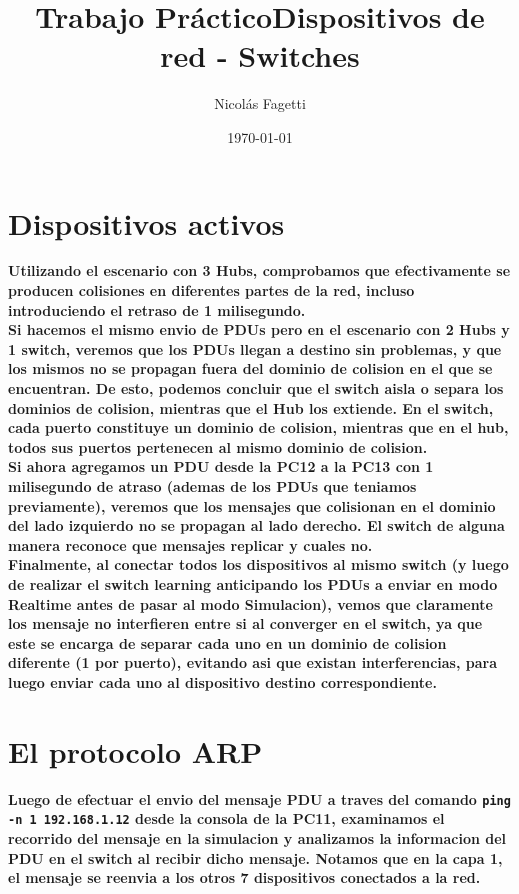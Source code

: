 \documentclass{article}
\title{Trabajo Práctico}
\title{Dispositivos de red - Switches}
\author{Nicolás Fagetti}
\date{\today}
\begin{document}
\maketitle

\section{Dispositivos activos}

\textbf{Utilizando el escenario con 3 Hubs, comprobamos que efectivamente se producen colisiones en diferentes partes de la red, incluso introduciendo el retraso de 1 milisegundo.} \\

\textbf{Si hacemos el mismo envio de PDUs pero en el escenario con 2 Hubs y 1 switch, veremos que los PDUs llegan a destino sin problemas, y que los mismos no se propagan fuera del dominio de colision en el que se encuentran. De esto, podemos concluir que el switch aisla o separa los dominios de colision, mientras que el Hub los extiende. En el switch, cada puerto constituye un dominio de colision, mientras que en el hub, todos sus puertos pertenecen al mismo dominio de colision.} \\

\textbf{Si ahora agregamos un PDU desde la PC12 a la PC13 con 1 milisegundo de atraso (ademas de los PDUs que teniamos previamente), veremos que los mensajes que colisionan en el dominio del lado izquierdo no se propagan al lado derecho. El switch de alguna manera reconoce que mensajes replicar y cuales no.} \\

\textbf{Finalmente, al conectar todos los dispositivos al mismo switch (y luego de realizar el switch learning anticipando los PDUs a enviar en modo Realtime antes de pasar al modo Simulacion), vemos que claramente los mensaje no interfieren entre si al converger en el switch, ya que este se encarga de separar cada uno en un dominio de colision diferente (1 por puerto), evitando asi que existan interferencias, para luego enviar cada uno al dispositivo destino correspondiente.} \\

\section{El protocolo ARP}

\textbf{Luego de efectuar el envio del mensaje PDU a traves del comando \texttt{ping -n 1 192.168.1.12} desde la consola de la PC11, examinamos el recorrido del mensaje en la simulacion y analizamos la informacion del PDU en el switch al recibir dicho mensaje. Notamos que en la capa 1, el mensaje se reenvia a los otros 7 dispositivos conectados a la red.} \\
\end{document}
